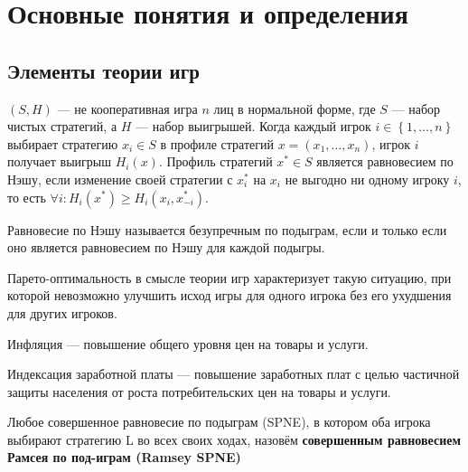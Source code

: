 \section{Основные понятия и определения}
\subsection{Элементы теории игр}

\begin{definition}
	$(S,H)$ --- не кооперативная игра $n$ лиц в нормальной
	форме, где $S$ --- набор чистых стратегий, а $H$ --- набор выигрышей. Когда
	каждый игрок $i \in \left\{1,\dots,n\right\}$  выбирает стратегию $x_i
	\in S$  в профиле стратегий $x=(x_1,\dots,x_n)$, игрок $i$  получает
	выигрыш $H_i(x)$. Профиль стратегий $x^* \in S$   является равновесием
	по Нэшу, если изменение своей стратегии с $x_i^*$  на $x_i$  не выгодно
	ни одному игроку $i$, то есть $\forall i : H_i(x^*) \geqslant H_i(x_i,
	x_{-i}^*)$.
\end{definition}
	
\begin{definition}
	Равновесие по Нэшу называется безупречным по подыграм, если и только если оно
	является равновесием по Нэшу для каждой подыгры. 
\end{definition}

\begin{definition}
Парето-оптимальность в смысле теории игр характеризует такую ситуацию, при которой невозможно улучшить исход игры для одного игрока без его ухудшения для других игроков.
\end{definition}

\begin{definition}
	Инфляция --- повышение общего уровня цен на товары и услуги.
\end{definition}

\begin{definition}
	Индексация заработной платы --- повышение заработных плат с целью частичной защиты населения от роста потребительских цен на товары и услуги.
\end{definition}

\begin{definition}
	Любое совершенное равновесие по подыграм (SPNE), в котором оба игрока выбирают стратегию L во всех своих ходах, назовём \textbf{совершенным равновесием Рамсея по под-играм (Ramsey SPNE)}~\cite{libich2008macroeconomic}
\end{definition}

